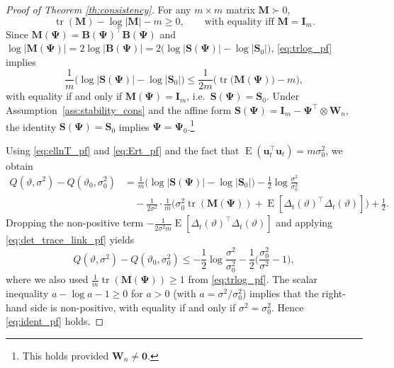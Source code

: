 \documentclass[12pt]{article}
\theoremstyle{plain}
\theoremstyle{definition}
\newcommand{\xvec}{\boldsymbol}
\newcommand{\xmat}{\mathbf}
\DeclareMathOperator{\E}{E}
\DeclareMathOperator{\tr}{tr}
\begin{document}
\begin{proof}[Proof of Theorem \ref{th:consistency}]
For any $m\times m$ matrix $\xmat{M}\succ0$,
\begin{equation}\label{eq:trlog_pf}
\tr(\xmat{M})-\log|\xmat{M}|-m\ge 0,
\qquad\text{with equality iff }\xmat{M}=\xmat{I}_m.
\end{equation}
Since $\xmat{M}(\xmat{\Psi})=\xmat{B}(\xmat{\Psi})^\top\xmat{B}(\xmat{\Psi})$ and
$\log|\xmat{M}(\xmat{\Psi})|
=2\log|\xmat{B}(\xmat{\Psi})|
=2\big(\log|\xmat{S}(\xmat{\Psi})|-\log|\xmat{S}_0|\big)$,
\eqref{eq:trlog_pf} implies
\begin{equation}\label{eq:det_trace_link_pf}
\frac{1}{m}\big(\log|\xmat{S}(\xmat{\Psi})|-\log|\xmat{S}_0|\big)
\le
\frac{1}{2m}\Big(\tr\big(\xmat{M}(\xmat{\Psi})\big)-m\Big),
\end{equation}
with equality if and only if $\xmat{M}(\xmat{\Psi})=\xmat{I}_m$, i.e.\ $\xmat{S}(\xmat{\Psi})=\xmat{S}_0$.
Under Assumption~\ref{ass:stability_cons} and the affine form
$\xmat{S}(\xmat{\Psi})=\xmat{I}_m-\xmat{\Psi}^\top\otimes\xmat{W}_n$, the identity
$\xmat{S}(\xmat{\Psi})=\xmat{S}_0$ implies $\xmat{\Psi}=\xmat{\Psi}_0$.\footnote{This holds provided $\xmat{W}_n\neq \xmat{0}$.}

Using \eqref{eq:ellnT_pf} and \eqref{eq:Ert_pf} and the fact that $\E(\xvec{u}_t^\top\xvec{u}_t)=m\sigma_0^2$, we obtain
\begin{align*}
Q(\vartheta,\sigma^2)-Q(\vartheta_0,\sigma_0^2)
&=
\frac{1}{m}\big(\log|\xmat{S}(\xmat{\Psi})|-\log|\xmat{S}_0|\big)
-\frac{1}{2}\log\frac{\sigma^2}{\sigma_0^2}\\
&\quad
-\frac{1}{2\sigma^2}\cdot\frac{1}{m}\Big(\sigma_0^2\tr(\xmat{M}(\xmat{\Psi}))
+\E[\Delta_t(\vartheta)^\top\Delta_t(\vartheta)]\Big)
+\frac{1}{2}.
\end{align*}
Dropping the non-positive term $-\frac{1}{2\sigma^2 m}\E[\Delta_t(\vartheta)^\top\Delta_t(\vartheta)]$ and applying
\eqref{eq:det_trace_link_pf} yields
\[
Q(\vartheta,\sigma^2)-Q(\vartheta_0,\sigma_0^2)
\le
-\frac{1}{2}\log\frac{\sigma^2}{\sigma_0^2}
-\frac{1}{2}\Big(\frac{\sigma_0^2}{\sigma^2}-1\Big),
\]
where we also used $\frac{1}{m}\tr(\xmat{M}(\xmat{\Psi}))\ge 1$ from \eqref{eq:trlog_pf}.
The scalar inequality $a-\log a-1\ge0$ for $a>0$ (with $a=\sigma^2/\sigma_0^2$) implies that the right-hand side is
non-positive, with equality if and only if $\sigma^2=\sigma_0^2$.
Hence \eqref{eq:ident_pf} holds.


\end{proof}
\end{document}
